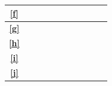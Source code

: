 \documentclass{article}
\begin{document}
\begin{table}[H]
\begin{tabular}{|c|c|c|c|c|c|c|c|c|c|c|}
	\textbf{\ref{f}}                     &                                                                     &                                                                     & \cellcolor{bleu_cite}                                              &                                                                    &                                                                     &                                                                    &                                                                    &                                                                      \\ \hline	
	\textbf{\ref{g}}                     &                                                                     &                                                                     & \cellcolor{bleu_cite}                                              &                                                                    &                                                                     &                                                                    &                                                                    &                                                                      \\ \hline
	\textbf{\ref{h}}                     &                                                                     &                                                                     &                                                                    & \cellcolor{bleu_cite}                                              &                                                                     &                                                                    &                                                                    &                                                                      \\ \hline	
	\textbf{\ref{i}}                     &                                                                     &                                                                     &                                                                    & \cellcolor{bleu_cite}                                              & \cellcolor{bleu_cite}                                               &                                                                    &                                                                    &                                                                      \\ \hline
	\textbf{\ref{j}}                     &                                                                     &                                                                     &                                                                    &                                                                    &                                                                     & \cellcolor{bleu_cite}                                              &                                                                    &                                                                      \\ \hline

\end{tabular}
\end{table}
\end{document}
